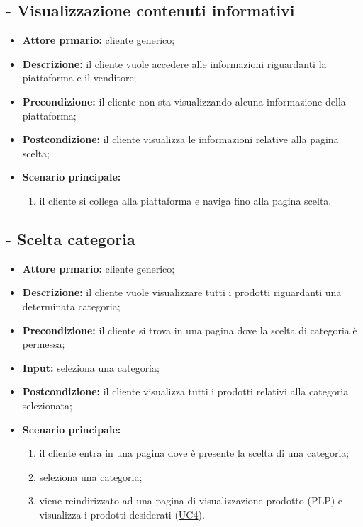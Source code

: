 \resetCUC

\stepUserCase
\subsection{ - Visualizzazione contenuti informativi}
\begin{itemize}
    \item \textbf{Attore prmario:} cliente generico;
    \item \textbf{Descrizione:} il cliente vuole accedere alle informazioni riguardanti la piattaforma e il venditore;
    \item \textbf{Precondizione:} il cliente non sta visualizzando alcuna informazione della piattaforma;
    \item \textbf{Postcondizione:} il cliente visualizza le informazioni relative alla pagina scelta;
    \item \textbf{Scenario principale:}
          \begin{enumerate}
              \item il cliente si collega alla piattaforma e naviga fino alla pagina scelta.
          \end{enumerate}
\end{itemize}

\stepUserCase
\subsection{ - Scelta categoria}
\begin{itemize}
    \item \textbf{Attore prmario:} cliente generico;
    \item \textbf{Descrizione:} il cliente vuole visualizzare tutti i prodotti riguardanti una determinata categoria;
    \item \textbf{Precondizione:} il cliente si trova in una pagina dove la scelta di categoria è permessa;
    \item \textbf{Input:} seleziona una categoria;
    \item \textbf{Postcondizione:} il cliente visualizza tutti i prodotti relativi alla categoria selezionata;
    \item \textbf{Scenario principale:}
          \begin{enumerate}
              \item il cliente entra in una pagina dove è presente la scelta di una categoria;
              \item seleziona una categoria;
              \item viene reindirizzato ad una pagina di visualizzazione prodotto (PLP) e visualizza i prodotti desiderati (\hyperref[UC4]{UC4}).
          \end{enumerate}
\end{itemize}

